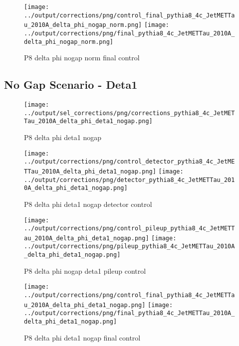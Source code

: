 \documentclass[11pt]{book}
\begin{document}
\begin{figure}[ht]
\centering
\texttt{[image: ../output/corrections/png/control\_final\_pythia8\_4c\_JetMETTau\_2010A\_delta\_phi\_nogap\_norm.png]}
\texttt{[image: ../output/corrections/png/final\_pythia8\_4c\_JetMETTau\_2010A\_delta\_phi\_nogap\_norm.png]}
\caption{P8 delta phi nogap norm final control}
\label{fig:p8_JetMETTau_2010A_delta_phi_nogap_norm_final_control}
\end{figure}




\clearpage
\subsection{No Gap Scenario - Deta1}
\begin{figure}[ht]
\centering
\texttt{[image: ../output/sel\_corrections/png/corrections\_pythia8\_4c\_JetMETTau\_2010A\_delta\_phi\_deta1\_nogap.png]}
\caption{P8 delta phi deta1 nogap}
\label{fig:p8_JetMETTau_2010A_delta_phi_deta1_nogap}
\end{figure}

\begin{figure}[ht]
\centering
\texttt{[image: ../output/corrections/png/control\_detector\_pythia8\_4c\_JetMETTau\_2010A\_delta\_phi\_deta1\_nogap.png]}
\texttt{[image: ../output/corrections/png/detector\_pythia8\_4c\_JetMETTau\_2010A\_delta\_phi\_deta1\_nogap.png]}
\caption{P8 delta phi deta1 nogap detector control}
\label{fig:p8_JetMETTau_2010A_delta_phi_deta1_nogap_detector_control}
\end{figure}

\begin{figure}[ht]
\centering
\texttt{[image: ../output/corrections/png/control\_pileup\_pythia8\_4c\_JetMETTau\_2010A\_delta\_phi\_deta1\_nogap.png]}
\texttt{[image: ../output/corrections/png/pileup\_pythia8\_4c\_JetMETTau\_2010A\_delta\_phi\_deta1\_nogap.png]}
\caption{P8 delta phi nogap deta1 pileup control}
\label{fig:p8_JetMETTau_2010A_delta_phi_deta1_nogap_pileup_control}
\end{figure}


\begin{figure}[ht]
\centering
\texttt{[image: ../output/corrections/png/control\_final\_pythia8\_4c\_JetMETTau\_2010A\_delta\_phi\_deta1\_nogap.png]}
\texttt{[image: ../output/corrections/png/final\_pythia8\_4c\_JetMETTau\_2010A\_delta\_phi\_deta1\_nogap.png]}
\caption{P8 delta phi deta1 nogap final control}
\label{fig:p8_JetMETTau_2010A_delta_phi_deta1_nogap_final_control}
\end{figure}
\end{document}
